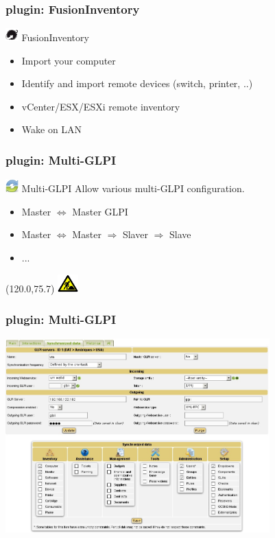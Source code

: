 \documentclass{beamer}
\newcommand{\WorkInProgress}{%
\begin{textblock}{14}(120.0,75.7)
\includegraphics[height=0.7cm]{./pics/workinprogress.jpg}
\end{textblock}
  }
\begin{document}
\begin{frame}
    \frametitle{plugin: FusionInventory}

    
    \begin{block}{\includegraphics[height=0.5cm]{./pics/plugins/fusioninventory.jpg} FusionInventory}
        \begin{itemize}
            \item Import your computer
            \item Identify and import remote devices (switch, printer, ..)
            \item vCenter/ESX/ESXi remote inventory
            \item Wake on LAN
        \end{itemize}
    \end{block}

\end{frame}


\begin{frame}
    \frametitle{plugin: Multi-GLPI}
    
    \begin{block}{\includegraphics[height=0.5cm]{./pics/plugins/multiglpi.jpg} Multi-GLPI}
        Allow various multi-GLPI configuration.
        \begin{itemize}
            \item Master $\Longleftrightarrow$ Master GLPI
            \item Master $\Longleftrightarrow$ Master $\Longrightarrow$ Slaver $\Longrightarrow$ Slave
            \item ...
        \end{itemize}
    \end{block}


\WorkInProgress
\end{frame}

\begin{frame}
    \frametitle{plugin: Multi-GLPI}

    \includegraphics[height=7.5cm]{./pics/multiglpi/multiGLPi.jpg}
    



\end{frame}
\end{document}
